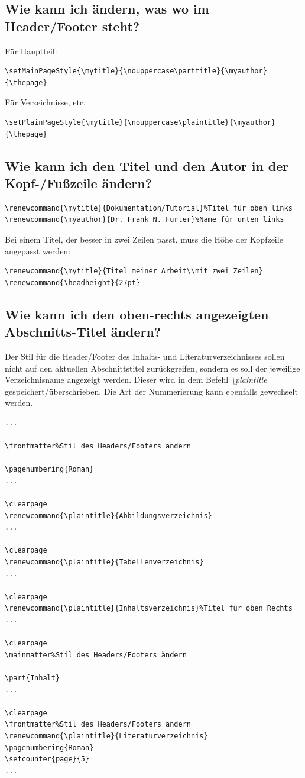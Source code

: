 \documentclass[12pt]{article}
\begin{document}
\subsection{Wie kann ich ändern, was wo im Header/Footer steht?}
Für Hauptteil:
\begin{verbatim}
\setMainPageStyle{\mytitle}{\nouppercase\parttitle}{\myauthor}{\thepage}
\end{verbatim}
Für Verzeichnisse, etc.
\begin{verbatim}
\setPlainPageStyle{\mytitle}{\nouppercase\plaintitle}{\myauthor}{\thepage}
\end{verbatim}

\subsection{Wie kann ich den Titel und den Autor in der Kopf-/Fußzeile ändern?}
\begin{verbatim}
\renewcommand{\mytitle}{Dokumentation/Tutorial}%Titel für oben links
\renewcommand{\myauthor}{Dr. Frank N. Furter}%Name für unten links
\end{verbatim}
Bei einem Titel, der besser in zwei Zeilen passt, muss die Höhe der Kopfzeile angepasst werden:
\begin{verbatim}
\renewcommand{\mytitle}{Titel meiner Arbeit\\mit zwei Zeilen}
\renewcommand{\headheight}{27pt}
\end{verbatim}

\subsection{Wie kann ich den oben-rechts angezeigten Abschnitts-Titel ändern?}
Der Stil für die Header/Footer des Inhalts- und Literaturverzeichnisses sollen nicht auf den aktuellen Abschnittstitel zurückgreifen, sondern es soll der jeweilige Verzeichnisname angezeigt werden. Dieser wird in dem Befehl \textit{\textbackslash plaintitle} gespeichert/überschrieben. Die Art der Nummerierung kann ebenfalls gewechselt werden.
\begin{verbatim}
...

\frontmatter%Stil des Headers/Footers ändern

\pagenumbering{Roman}
...

\clearpage
\renewcommand{\plaintitle}{Abbildungsverzeichnis}
...

\clearpage
\renewcommand{\plaintitle}{Tabellenverzeichnis}
...

\clearpage
\renewcommand{\plaintitle}{Inhaltsverzeichnis}%Titel für oben Rechts
...

\clearpage
\mainmatter%Stil des Headers/Footers ändern

\part{Inhalt}
...

\clearpage
\frontmatter%Stil des Headers/Footers ändern
\renewcommand{\plaintitle}{Literaturverzeichnis}
\pagenumbering{Roman}
\setcounter{page}{5}
...
\end{verbatim}
\end{document}
